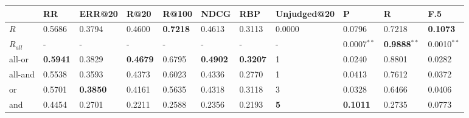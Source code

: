 \begin{tabular}{lllllllllll}
\toprule
{} &                    RR &                ERR@20 &                  R@20 &                 R@100 &                    NDCG &                   RBP &      Unjudged@20 &                     P &                       R &                   F.5 \\
\midrule
$R$       &           0.5686$^{}$ &           0.3794$^{}$ &           0.4600$^{}$ &  \textbf{0.7218}$^{}$ &             0.4613$^{}$ &           0.3113$^{}$ &      0.0000$^{}$ &           0.0796$^{}$ &             0.7218$^{}$ &  \textbf{0.1073}$^{}$ \\
$R_{all}$ &           - &           - &          - &           - &  - &           - &     - &         0.0007$^{**}$ &  \textbf{0.9888}$^{**}$ &         0.0010$^{**}$ \\
all-or    &  \textbf{0.5941}$^{}$ &           0.3829$^{}$ &  \textbf{0.4679}$^{}$ &           0.6795$^{}$ &             \textbf{0.4902$^{}$} &  \textbf{0.3207}$^{}$ &           1$^{}$ &           0.0240$^{}$ &             0.8801$^{}$ &           0.0282$^{}$ \\
all-and   &           0.5538$^{}$ &           0.3593$^{}$ &           0.4373$^{}$ &           0.6023$^{}$ &             0.4336$^{}$ &           0.2770$^{}$ &           1$^{}$ &           0.0413$^{}$ &             0.7612$^{}$ &           0.0372$^{}$ \\
or        &           0.5701$^{}$ &  \textbf{0.3850}$^{}$ &           0.4161$^{}$ &           0.5635$^{}$ &             0.4318$^{}$ &           0.3118$^{}$ &           3$^{}$ &           0.0328$^{}$ &             0.6466$^{}$ &           0.0406$^{}$ \\
and       &           0.4454$^{}$ &           0.2701$^{}$ &           0.2211$^{}$ &           0.2588$^{}$ &             0.2356$^{}$ &           0.2193$^{}$ &  \textbf{5}$^{}$ &  \textbf{0.1011}$^{}$ &             0.2735$^{}$ &           0.0773$^{}$ \\
\bottomrule
\end{tabular}
